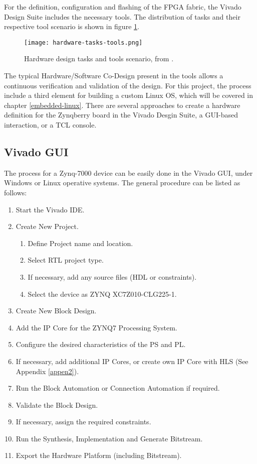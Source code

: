 For the definition, configuration and flashing of the FPGA fabric, the Vivado Design Suite includes
the necessary tools. The distribution of tasks and their respective tool scenario is shown in figure
\ref{fig:hardware-tasks-tools}.

\begin{figure}[htp]
	\centering
	\texttt{[image: hardware-tasks-tools.png]}
	\caption{Hardware design tasks and tools scenario, from \cite{UG1043}.}
	\label{fig:hardware-tasks-tools}
\end{figure}%

The typical Hardware/Software Co-Design present in the tools allows a continuous verification and
validation of the design. For this project, the process include a third element for building a
custom Linux OS, which will be covered in chapter \ref{embedded-linux}. There are several approaches
to create a hardware definition for the Zynqberry board in the Vivado Desgin Suite, a GUI-based
interaction, or a TCL console.

\subsection{Vivado GUI}

The process for a Zynq-7000 device can be easily done in the Vivado GUI, under Windows or Linux
operative systems. The general procedure can be listed as follows:

\begin{enumerate}
	\item Start the Vivado IDE.
	\item Create New Project.
	\begin{enumerate}
		\item Define Project name and location.
		\item Select RTL project type.
		\item If necessary, add any source files (HDL or constraints).
		\item Select the device as ZYNQ XC7Z010-CLG225-1.
	\end{enumerate}
	\item Create New Block Design.
	\item Add the IP Core for the ZYNQ7 Processing System.
	\item Configure the desired characteristics of the PS and PL.
	\item If necessary, add additional IP Cores, or create own IP Core with HLS (See Appendix
	\ref{appen2}).
	\item Run the Block Automation or Connection Automation if required.
	\item Validate the Block Design.
	\item If necessary, assign the required constraints.
	\item Run the Synthesis, Implementation and Generate Bitstream.
	\item Export the Hardware Platform (including Bitstream).
\end{enumerate}


